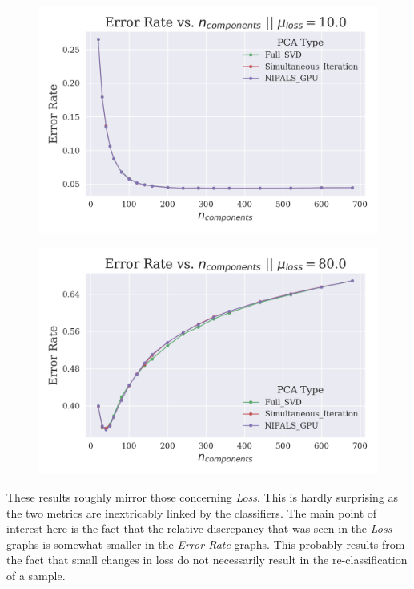 \documentclass[12pt]{article}
\begin{document}
\begin{figure}[H]
\centering
\begin{minipage}{.45\textwidth}
  \centering
  \includegraphics[width=\linewidth]{Noise10Error.png}
  \label{Noise10Error}
\end{minipage}%
\quad
\begin{minipage}{.45\textwidth}
  \centering
  \includegraphics[width=\linewidth]{Noise80Error.png}
  \label{Noise80Error}
\end{minipage}
\end{figure}

These results roughly mirror those concerning \textit{Loss}. This is hardly surprising as the two metrics are inextricably linked by the classifiers. The main point of interest here is the fact that the relative discrepancy that was seen in the \textit{Loss} graphs is somewhat smaller in the \textit{Error Rate} graphs. This probably results from the fact that small changes in loss do not necessarily result in the re-classification of a sample.
\end{document}

